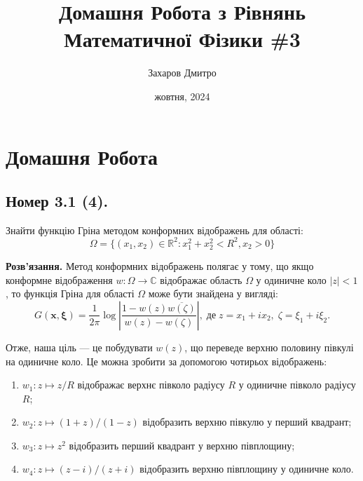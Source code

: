 \documentclass{hw_template}
\title{\huge\sffamily\bfseries Домашня Робота з Рівнянь Математичної Фізики \#3}
\author{\Large\sffamily Захаров Дмитро}
\date{\sffamily 26 жовтня, 2024}
\begin{document}
\pagestyle{fancy}

\maketitle

\tableofcontents

\pagebreak

\section{Домашня Робота}

\subsection{Номер 3.1 (4).}

\begin{problem}
    Знайти функцію Гріна методом конформних відображень для області:
    \begin{equation*}
        \Omega = \{(x_1,x_2) \in \mathbb{R}^2: x_1^2 + x_2^2 < R^2, x_2 > 0\}
    \end{equation*}
\end{problem}

\textbf{Розв'язання.} Метод конформних відображень полягає у тому, що якщо конформне відображення $w: \Omega \to \mathbb{C}$ відображає область $\Omega$ у одиничне коло $|z|<1$, то функція Гріна для області $\Omega$ може бути знайдена у вигляді:
\begin{equation*}
    G(\mathbf{x},\boldsymbol{\xi}) = \frac{1}{2\pi}\log\left|\frac{1-w(z)\overline{w(\zeta)}}{w(z)-w(\zeta)}\right|, \; \text{де} \; z = x_1+ix_2, \; \zeta = \xi_1+i\xi_2.
\end{equation*}

Отже, наша ціль --- це побудувати $w(z)$, що переведе верхню половину півкулі на одиничне коло. Це можна зробити за допомогою чотирьох відображень:
\begin{enumerate}
    \item $w_1: z \mapsto z/R$ відображає верхнє півколо радіусу $R$ у одиничне півколо радіусу $R$;
    \item $w_2: z \mapsto (1+z)/(1-z)$ відобразить верхню півкулю у перший квадрант;
    \item $w_3: z \mapsto z^2$ відобразить перший квадрант у верхню півплощину;
    \item $w_4: z \mapsto (z-i)/(z+i)$ відобразить верхню півплощину у одиничне коло.
\end{enumerate}
\end{document}
